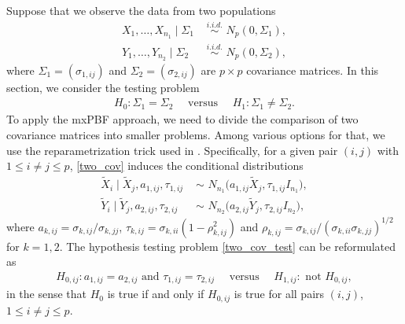 \documentclass[11pt]{article}
\newcommand{\bean}{\begin{eqnarray}}
\newcommand{\eean}{\end{eqnarray}}
\newcommand{\sg}{\Sigma}
\begin{document}
Suppose that we observe the data from two populations
\begin{equation}
	\begin{split}\label{two_cov}
		X_1,\ldots, X_{n_1} \mid \sg_1 &\,\,\overset{i.i.d.}{\sim}\,\, N_p (0, \sg_1) , \\
		Y_1,\ldots, Y_{n_2} \mid \sg_2 &\,\,\overset{i.i.d.}{\sim}\,\, N_p (0, \sg_2),
	\end{split}
\end{equation}
where $\sg_1 = (\sigma_{1,ij})$ and $\sg_2 = (\sigma_{2,ij})$ are $p\times p$ covariance matrices.
In this section, we consider the  testing problem
\bean\label{two_cov_test}
H_0:\sg_1=\sg_2 \quad\text{ versus }\quad H_1:\sg_1\neq \sg_2.
\eean
To apply the mxPBF approach, we need to divide the comparison of two covariance matrices into smaller problems. Among various options for that, we use the reparametrization trick used in \cite{lee2018maximum}.
Specifically, for a given pair $(i,j)$ with $1\le i\neq j \le p$, \eqref{two_cov} induces the conditional distributions
\begin{equation}
	\begin{split}\label{cond_dist_XY}
		\tilde{X}_i \mid \tilde{X}_j, a_{1,ij}, \tau_{1,ij} \,\,&\sim\,\, N_{n_1}\big( a_{1,ij}\tilde{X}_j, \tau_{1,ij}I_{n_1}  \big), \\
		\tilde{Y}_i \mid \tilde{Y}_j, a_{2,ij}, \tau_{2,ij} \,\,&\sim\,\, N_{n_2}\big( a_{2,ij}\tilde{Y}_j, \tau_{2,ij}I_{n_2}  \big),
	\end{split}	
\end{equation}
where $a_{k,ij}= \sigma_{k,ij}/\sigma_{k,jj}$,  $\tau_{k,ij} = \sigma_{k,ii}(1- \rho_{k,ij}^2)$ and $\rho_{k,ij} = \sigma_{k,ij}/ (\sigma_{k,ii} \sigma_{k,jj} )^{1/2}$  for $k=1,2$.
The hypothesis testing problem \eqref{two_cov_test} can be reformulated as 
\bean\label{two_cov_ij_pair}
H_{0,ij}: a_{1,ij}= a_{2,ij} \text{ and } \tau_{1,ij}=\tau_{2,ij} \quad\text{ versus }\quad H_{1,ij}: \text{ not } H_{0,ij},
\eean
in the sense that $H_0$ is true if and only if $H_{0,ij}$ is true for all pairs $(i,j)$, $1\le i\neq j\le p$.
\end{document}
